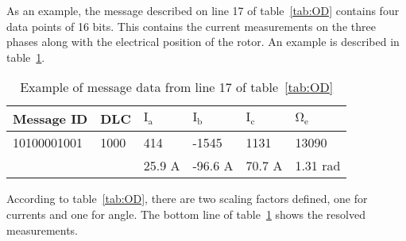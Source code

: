 As an example, the message described on line 17 of table~\ref{tab:OD} contains four data points of 16 bits. 
This contains the current measurements on the three phases along with the electrical position of the rotor.
An example is described in table~\ref{tab:message17_OD}.

\begin{table}
	\centering
	\begin{tabular}{l|l|l|l|l|l}
		Message ID & DLC & $\mathrm{I_a}$ & $\mathrm{I_b}$ & $\mathrm{I_c}$ & $\mathrm{\Omega _e}$ \\ 
		\hline
		10100001001 & 1000 & 414 & -1545 & 1131 & 13090 \\
		\hline
		 & & 25.9 A & -96.6 A & 70.7 A & 1.31 rad
	\end{tabular}
	\caption{Example of message data from line 17 of table~\ref{tab:OD}}
	\label{tab:message17_OD}
\end{table}
According to table~\ref{tab:OD}, there are two scaling factors defined, one for currents and one for angle. 
The bottom line of table~\ref{tab:message17_OD} shows the resolved measurements.
